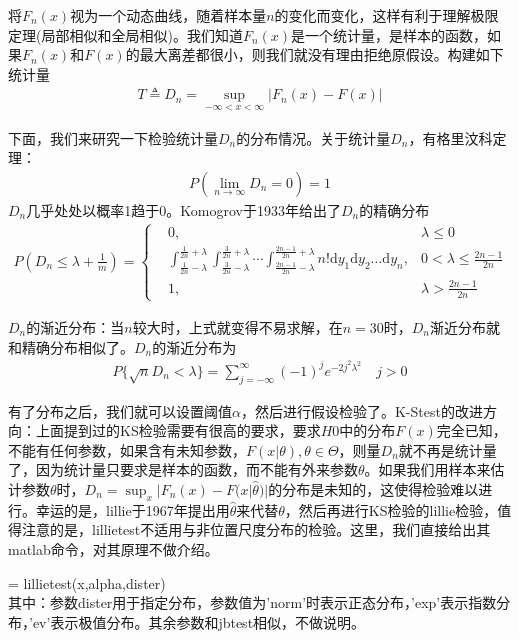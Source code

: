             将$F_n(x)$视为一个动态曲线，随着样本量$n$的变化而变化，这样有利于理解极限定理(局部相似和全局相似)。我们知道$F_n(x)$是一个统计量，是样本的函数，如果$F_n(x)$和$F(x)$的最大离差都很小，则我们就没有理由拒绝原假设。构建如下统计量
            \begin{align*}
            T \triangleq D_n = \sup_{-\infty <x <\infty}|F_n(x) - F(x)|
            \end{align*}
            \par
            下面，我们来研究一下检验统计量$D_n$的分布情况。关于统计量$D_n$，有格里汶科定理：
            \begin{align*}
            P \left( \lim\limits_{n\rightarrow \infty} D_n = 0 \right) = 1
            \end{align*}
            $D_n$几乎处处以概率1趋于0。Komogrov于1933年给出了$D_n$的精确分布
            \begin{align*}
            P \left( D_n \leqslant \lambda +\frac{1}{m} \right)  =
            \left\{
              \begin{aligned}
              &0 ,& \lambda \leqslant 0\\
              &\int_{\frac{1}{2n}-\lambda}^{\frac{1}{2n}+\lambda} \int_{\frac{3}{2n}-\lambda}^{\frac{3}{2n}+\lambda} \cdots\int_{\frac{2n-1}{2n}-\lambda}^{\frac{2n-1}{2n}+\lambda} n!\mathrm{d}y_1\mathrm{d}y_2\dots\mathrm{d}y_n ,& 0< \lambda \leqslant \frac{2n-1}{2n}\\
              &1 ,& \lambda >\frac{2n-1}{2n}
              \end{aligned}
            \right.
            \end{align*}
            \par
            $D_n$的渐近分布：当$n$较大时，上式就变得不易求解，在$n = 30$时，$D_n$渐近分布就和精确分布相似了。$D_n$的渐近分布为
            \begin{align*}
            P\{\sqrt{n}D_n<\lambda\} = \sum_{j=-\infty}^\infty (-1)^j e^{-2j^2\lambda^2} \quad j>0
            \end{align*}
            \par
            有了分布之后，我们就可以设置阈值$\alpha$，然后进行假设检验了。K-Stest的改进方向：上面提到过的KS检验需要有很高的要求，要求$H0$中的分布$F(x)$完全已知，不能有任何参数，如果含有未知参数，$F(x|\theta),\theta\in \Theta$，则量$D_n$就不再是统计量了，因为统计量只要求是样本的函数，而不能有外来参数$\theta$。如果我们用样本来估计参数$\theta$时，$D_n = \sup_x|F_n(x) - F(x|\hat{\theta})|$的分布是未知的，这使得检验难以进行。幸运的是，lillie于1967年提出用$\hat{\theta}$来代替$\theta$，然后再进行KS检验的lillie检验，值得注意的是，lillietest不适用与非位置尺度分布的检验。这里，我们直接给出其matlab命令，对其原理不做介绍。
            \par
            [h,p,kstat,crival] = lillietest(x,alpha,dister)\\
            其中：参数dister用于指定分布，参数值为'norm'时表示正态分布，'exp'表示指数分布，'ev'表示极值分布。其余参数和jbtest相似，不做说明。
